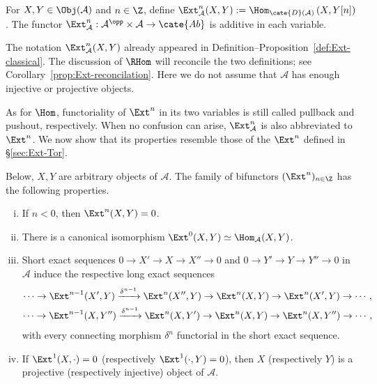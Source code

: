 \begin{definition}\label{def:Ext-general}
	For $X,Y\in\Obj(\mathcal{A})$ and $n\in\Z$, define
	$\Ext^n_{\mathcal{A}}(X,Y):=
	\Hom_{\cate{D}(\mathcal{A})}\left(X,Y[n]\right)$. The functor
	$\Ext^n_{\mathcal{A}}:\mathcal{A}^{\opp}\times\mathcal{A}\to
	\cate{Ab}$ is additive in each variable.
\end{definition}

The notation $\Ext^n_{\mathcal{A}}(X,Y)$ already appeared in
Definition--Proposition~\ref{def:Ext-classical}. The discussion of $\RHom$
will reconcile the two definitions; see
Corollary~\ref{prop:Ext-reconcilation}. Here we do not assume that
$\mathcal{A}$ has enough injective or projective objects.

As for $\Hom$, functoriality of $\Ext^n$ in its two variables is still called
pullback and pushout, respectively. When no confusion can arise,
$\Ext^n_{\mathcal{A}}$ is also abbreviated to $\Ext^n$. We now show that its
properties resemble those of the $\Ext^n$ defined in \S\ref{sec:Ext-Tor}.

\begin{proposition}\label{prop:Ext-generalities}
	Below, $X,Y$ are arbitrary objects of $\mathcal{A}$. The family of
	bifunctors $(\Ext^n)_{n\in\Z}$ has the following properties.
	\begin{enumerate}[(i)]
		\item If $n<0$, then $\Ext^n(X,Y)=0$.
		\item There is a canonical isomorphism
		$\Ext^0(X,Y)\simeq\Hom_{\mathcal{A}}(X,Y)$.
		\item Short exact sequences
		$0\to X'\to X\to X''\to0$ and
		$0\to Y'\to Y\to Y''\to0$ in $\mathcal{A}$ induce the respective
		long exact sequences
		\begin{gather*}
			\cdots \to \Ext^{n-1}(X', Y) \xrightarrow{\delta^{n-1}} \Ext^n(X'', Y) \to \Ext^n(X, Y) \to \Ext^n(X', Y) \to \cdots , \\
			\cdots \to \Ext^{n-1}(X, Y'') \xrightarrow{\delta^{n-1}} \Ext^n(X, Y') \to \Ext^n(X, Y) \to \Ext^n(X, Y'') \to \cdots ,
		\end{gather*}
		with every connecting morphism $\delta^n$ functorial in the short
		exact sequence.
		\item If $\Ext^1(X,\cdot)=0$ (respectively
		$\Ext^1(\cdot,Y)=0$), then $X$ (respectively $Y$) is a projective
		(respectively injective) object of $\mathcal{A}$.
	\end{enumerate}
\end{proposition}


